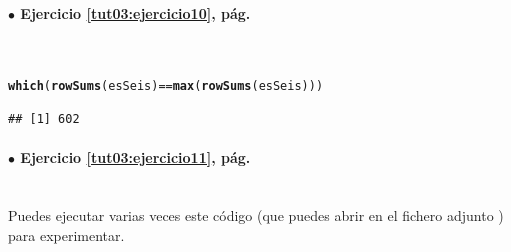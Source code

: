 \documentclass[10pt,a4paper]{article}\usepackage[]{graphicx}\usepackage[]{color}
\makeatletter
\newcommand{\hlopt}[1]{\textcolor[rgb]{0,0,0}{#1}}%
\newcommand{\hlstd}[1]{\textcolor[rgb]{0.345,0.345,0.345}{#1}}%
\newcommand{\hlkwd}[1]{\textcolor[rgb]{0.737,0.353,0.396}{\textbf{#1}}}%
\newenvironment{kframe}{%
 \def\at@end@of@kframe{}%
 \ifinner\ifhmode%
  \def\at@end@of@kframe{\end{minipage}}%
  \begin{minipage}{\columnwidth}%
 \fi\fi%
 \def\FrameCommand##1{\hskip\@totalleftmargin \hskip-\fboxsep
 \colorbox{shadecolor}{##1}\hskip-\fboxsep
     \hskip-\linewidth \hskip-\@totalleftmargin \hskip\columnwidth}%
 \MakeFramed {\advance\hsize-\width
   \@totalleftmargin\z@ \linewidth\hsize
   \@setminipage}}%
 {\par\unskip\endMakeFramed%
 \at@end@of@kframe}
\newenvironment{knitrout}{}{} %
\makeatother
\begin{document}
\paragraph{\bf $\bullet$ Ejercicio \ref{tut03:ejercicio10}, pág. \pageref{tut03:ejercicio10}}
\label{tut03:ejercicio10:sol}\quad\\

\begin{knitrout}
\color{fgcolor}\begin{kframe}
\begin{alltt}
    \hlkwd{which}\hlstd{(}\hlkwd{rowSums}\hlstd{(esSeis)} \hlopt{==} \hlkwd{max}\hlstd{(}\hlkwd{rowSums}\hlstd{(esSeis)))}
\end{alltt}
\begin{verbatim}
## [1] 602
\end{verbatim}
\end{kframe}
\end{knitrout}

\paragraph{\bf $\bullet$ Ejercicio \ref{tut03:ejercicio11}, pág. \pageref{tut03:ejercicio11}}
\label{tut03:ejercicio11:sol}\quad\\

Puedes ejecutar varias veces este código (que puedes abrir en el fichero adjunto ) para experimentar.
\end{document}
